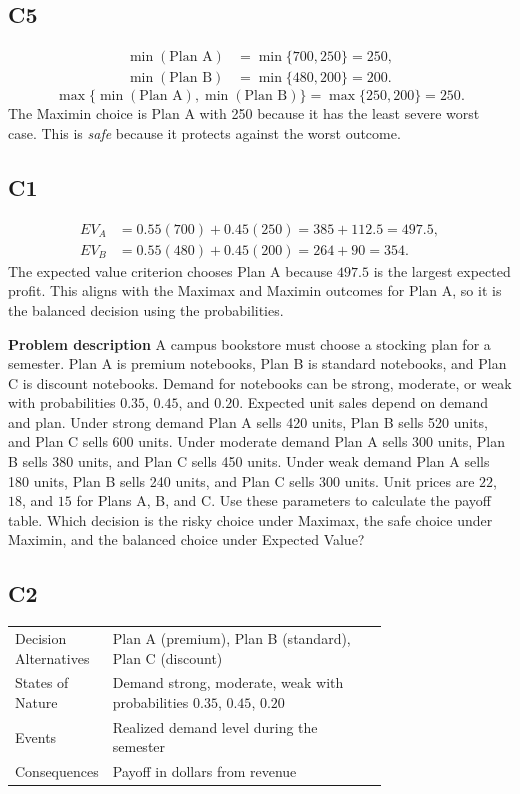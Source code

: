 \begin{ExamProblems}
		\subsection*{C5}
		\[
		\begin{aligned}
		\min(\text{Plan A}) &= \min\{700,250\} = 250,\\
		\min(\text{Plan B}) &= \min\{480,200\} = 200.
		\end{aligned}
		\]
		\[
		\max\{\min(\text{Plan A}), \min(\text{Plan B})\}
		= \max\{250, 200\}
		= 250.
		\]
		The Maximin choice is Plan A with 250 because it has the least severe worst case. This is \emph{safe} because it protects against the worst outcome.

		\subsection*{C1}
		\[
		\begin{aligned}
		EV_A &= 0.55(700)+0.45(250)=385+112.5=497.5,\\
		EV_B &= 0.55(480)+0.45(200)=264+90=354.
		\end{aligned}
		\]
		The expected value criterion chooses Plan A because $497.5$ is the largest expected profit. This aligns with the Maximax and Maximin outcomes for Plan A, so it is the balanced decision using the probabilities.

		\item
		\textbf{Problem description}
		A campus bookstore must choose a stocking plan for a semester. Plan A is premium notebooks, Plan B is standard notebooks, and Plan C is discount notebooks. Demand for notebooks can be strong, moderate, or weak with probabilities $0.35$, $0.45$, and $0.20$. Expected unit sales depend on demand and plan. Under strong demand Plan A sells 420 units, Plan B sells 520 units, and Plan C sells 600 units. Under moderate demand Plan A sells 300 units, Plan B sells 380 units, and Plan C sells 450 units. Under weak demand Plan A sells 180 units, Plan B sells 240 units, and Plan C sells 300 units. Unit prices are $22$, $18$, and $15$ for Plans A, B, and C. Use these parameters to calculate the payoff table. Which decision is the risky choice under Maximax, the safe choice under Maximin, and the balanced choice under Expected Value?

		\subsection*{C2}
		\begin{center}
			\begin{tabular}{l p{0.74\linewidth}}
				\toprule
				Decision Alternatives & Plan A (premium), Plan B (standard), Plan C (discount) \\
				States of Nature & Demand strong, moderate, weak with probabilities $0.35$, $0.45$, $0.20$ \\
				Events & Realized demand level during the semester \\
				Consequences & Payoff in dollars from revenue \\
				\bottomrule
			\end{tabular}
		\end{center}


\end{ExamProblems}
